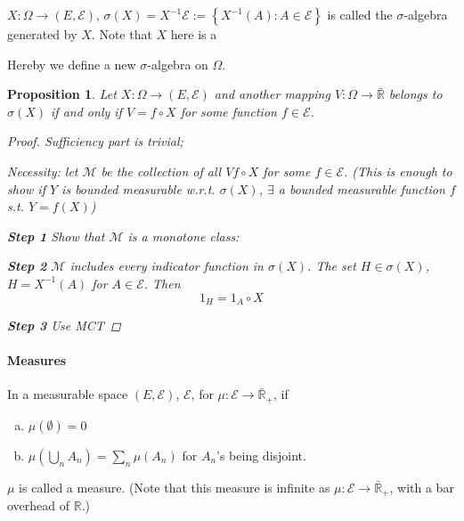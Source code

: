 \documentclass[11pt]{article}
\newcommand{\m}{\mathcal}
\newcommand{\R}{{\mathbb R}}
\newtheorem{proposition}[theorem]{Proposition}
\begin{document}
\begin{definition}
  $X : \Omega \to ( E , \mathcal E)$, $\sigma (X) = X^{-1} \mathcal E := \left\{
    X^{-1}(A) : A \in \mathcal E \right\}$ is called the $\sigma$-algebra
    generated by $X$. Note that $X$ here is a

    Hereby we define a new $\sigma$-algebra on $\Omega$. 
\end{definition}

\begin{proposition}
  Let $X : \Omega \to (E, \mathcal E)$ and another mapping $V : \Omega \to \bar
  \R$ belongs to $\sigma (X)$ if and only if $V = f \circ X $ for some function
  $f \in \mathcal E$. 
  \begin{proof}
    Sufficiency part is trivial; 

    Necessity: let $\mathcal M $ be the collection of all $V  f\circ X$ for some
    $f \in\mathcal E$. (This is enough to show if $Y$ is bounded measurable
    w.r.t. $\sigma (X)$, $\exists$ a bounded measurable function $f$ s.t. $Y =
    f(X)$)

    \textbf{Step 1} Show that $\mathcal M $ is a monotone class: 
    \label{homework}

    \textbf{Step 2} $\mathcal M$ includes every indicator function in $\sigma
    (X)$. The set $H \in \sigma (X)$, $H = X^{-1}(A)$ for $A \in \mathcal E$.
    Then 
    \[
      1 _ H = 1 _ A \circ X
    \]

    \textbf{Step 3 } Use MCT



  \end{proof}
\end{proposition}

\paragraph{Measures}
\begin{definition}
In a measurable space $(E, \mathcal E)$, $\m E$, for $\mu : \mathcal E \to
\bar \R_+$, if 
\begin{enumerate}[(a)]
  \item $\mu (\emptyset) = 0$
  \item $\mu ( \bigcup _ n A_n) = \sum_n \mu (A_n)$ for $A_n$'s being disjoint.
\end{enumerate}
$\mu$ is called a measure. (Note that this measure is infinite as $\mu: \mathcal E
\to \bar \R_+$, with a  bar overhead of $\R$.)
\end{definition}
\end{document}

